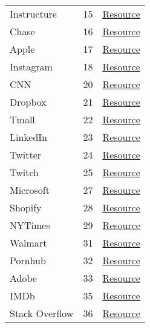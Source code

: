 \begin{longtable}{lrl}
Instructure   &    15 & \href{www.instructure.com/sites/blog.instructure/files/uploaded-assets/menu/logo/starter.svg}{Resource} \\
Chase         &    16 & \href{creditcards.chase.com/R111-003/1110010/images/chasebank-logo-icon.svg}{Resource} \\
Apple         &    17 & \href{www.apple.com/ac/globalnav/5/en\_US/images/globalnav/links/tv/image\_large.svg}{Resource} \\
Instagram     &    18 & \href{www.instagram.com/static/images/shared/nav-shadow.png/fae1c515f490.png}{Resource} \\
CNN           &    20 & \href{cdn.cnn.com/cnn/images/bulletin/arrow.png}{Resource} \\
Dropbox       &    21 & \href{cfl.dropboxstatic.com/static/images/icons/icon\_spacer-vflN3BYt2.gif}{Resource} \\
Tmall         &    22 & \href{g.alicdn.com/s.gif}{Resource} \\
LinkedIn      &    23 & \href{static-exp1.licdn.com/sc/h/3z4gbn751g6l5onl9gg9s5ckg}{Resource} \\
Twitter       &    24 & \href{abs.twimg.com/favicons/favicon.ico}{Resource} \\
Twitch        &    25 & \href{static.twitchcdn.net/assets/favicon-32-d6025c14e900565d6177.png}{Resource} \\
Microsoft     &    27 & \href{www.microsoft.com/onerfstatics/marketingsites-eus-prod/\_h/9be151e5/coreui.statics/images/1x1clear.gif}{Resource} \\
Shopify       &    28 & \href{cdn.shopify.com/shopify-marketing\_assets/static/shopify-favicon.png}{Resource} \\
NYTimes       &    29 & \href{www.nytimes.com/vi-assets/static-assets/icon-facebook-20x20-fullcolor-7312c440fd2b6f323c675d8a08c023e2.svg}{Resource} \\
Walmart       &    31 & \href{www.walmart.com/favicon.ico}{Resource} \\
Pornhub       &    32 & \href{ci.phncdn.com/www-static/images/rightArrow.png}{Resource} \\
Adobe         &    33 & \href{www.adobe.com/content/dam/cc/icons/device-web.svg}{Resource} \\
IMDb          &    35 & \href{m.media-amazon.com/images/G/01/imdb/images/rating/spinner-3099941772.\_V\_.gif}{Resource} \\
Stack Overflow &    36 &\href{ cdn.sstatic.net/Img/home/votes.svg?v=989b3861569f}{Resource} \\

\end{longtable}
